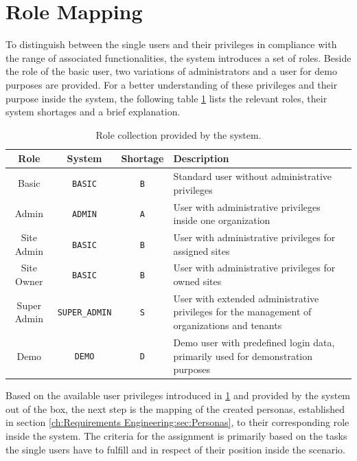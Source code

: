 \section{Role Mapping}
\label{ch:Requirements Engineering:sec:Role Mapping}

To distinguish between the single users and their privileges in compliance with the range of associated functionalities, the system introduces a set of roles. Beside the role of the basic user, two variations of administrators and a user for demo purposes are provided.
For a better understanding of these privileges and their purpose inside the system, the following table \ref{tab:system-role-collection} lists the relevant roles, their system shortages and a brief explanation.

\begingroup
\setlength{\tabcolsep}{10pt} %
\renewcommand{\arraystretch}{1.5} %
\begin{table}[h]
    \centering
    \caption{Role collection provided by the system.}
    \begin{tabular}{c|c|c|m{6cm}}
        Role & System & Shortage & Description \\
        \hline
        Basic & \verb|BASIC| & \verb|B| & Standard user without administrative privileges \\
        Admin & \verb|ADMIN| & \verb|A| & User with administrative privileges inside one organization \\
        Site Admin & \verb|BASIC| & \verb|B| & User with administrative privileges for assigned sites \\
        Site Owner & \verb|BASIC| & \verb|B| & User with administrative privileges for owned sites \\
        Super Admin & \verb|SUPER_ADMIN| & \verb|S| & User with extended administrative privileges for the management of organizations and tenants \\
        Demo & \verb|DEMO| & \verb|D| & Demo user with predefined login data, primarily used for demonstration purposes \\
    \end{tabular}
    \label{tab:system-role-collection}
\end{table}
\endgroup

\noindent Based on the available user privileges introduced in \ref{tab:system-role-collection} and provided by the system out of the box, the next step is the mapping of the created personas, established in section \ref{ch:Requirements Engineering:sec:Personas}, to their corresponding role inside the system.
The criteria for the assignment is primarily based on the tasks the single users have to fulfill and in respect of their position inside the scenario.

